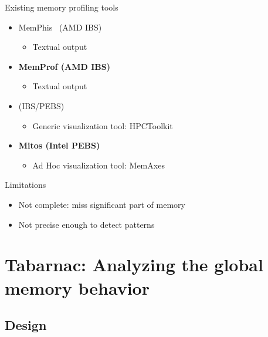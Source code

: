 \documentclass[xcolor={usenames,dvipsnames},hyperref={pdfusetitle}]{beamer}
\begin{document}
\begin{frame}{Existing memory profiling tools}
    \begin{block}{}
        \begin{itemize}
            \item MemPhis~\cite{McCurdy10Memphis} (AMD IBS)
                \begin{itemize}
                    \item Textual output
                \end{itemize}
            \item \textbf{MemProf \cite{Lachaize12MemProf} (AMD IBS)}
                \begin{itemize}
                    \item Textual output
                \end{itemize}
            \item \cite{Liu14Tool} (IBS/PEBS)
                \begin{itemize}
                    \item Generic visualization tool: HPCToolkit
                \end{itemize}
            \item \textbf{Mitos \cite{Gimenez14Dissecting} (Intel PEBS)}
                \begin{itemize}
                    \item Ad Hoc visualization tool: MemAxes
                \end{itemize}
        \end{itemize}
    \end{block}
\pause
\begin{alertblock}{Limitations}
    \begin{itemize}
        \item Not complete: miss significant part of memory
        \item Not precise enough to detect patterns
    \end{itemize}
\end{alertblock}
\end{frame}

\section{Tabarnac: Analyzing the global memory behavior}

\subsection{Design}
\end{document}
